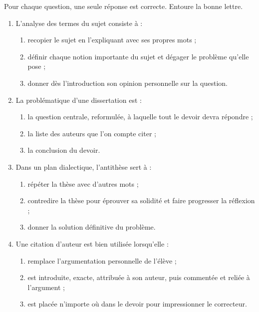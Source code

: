 \documentclass[11pt]{article}
\begin{document}
\begin{exercice}
Pour chaque question, une seule réponse est correcte. Entoure la bonne lettre.

\begin{enumerate}
\item L'analyse des termes du sujet consiste à :
\begin{enumerate}
\item recopier le sujet en l'expliquant avec ses propres mots ;
\item définir chaque notion importante du sujet et dégager le problème qu'elle pose ;
\item donner dès l'introduction son opinion personnelle sur la question.
\end{enumerate}
\item La problématique d'une dissertation est :
\begin{enumerate}
\item la question centrale, reformulée, à laquelle tout le devoir devra répondre ;
\item la liste des auteurs que l'on compte citer ;
\item la conclusion du devoir.
\end{enumerate}
\item Dans un plan dialectique, l'antithèse sert à :
\begin{enumerate}
\item répéter la thèse avec d'autres mots ;
\item contredire la thèse pour éprouver sa solidité et faire progresser la réflexion ;
\item donner la solution définitive du problème.
\end{enumerate}
\item Une citation d'auteur est bien utilisée lorsqu'elle :
\begin{enumerate}
\item remplace l'argumentation personnelle de l'élève ;
\item est introduite, exacte, attribuée à son auteur, puis commentée et reliée à l'argument ;
\item est placée n'importe où dans le devoir pour impressionner le correcteur.
\end{enumerate}
\end{enumerate}
\end{exercice}
\end{document}
